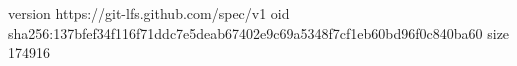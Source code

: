 version https://git-lfs.github.com/spec/v1
oid sha256:137bfef34f116f71ddc7e5deab67402e9c69a5348f7cf1eb60bd96f0c840ba60
size 174916
